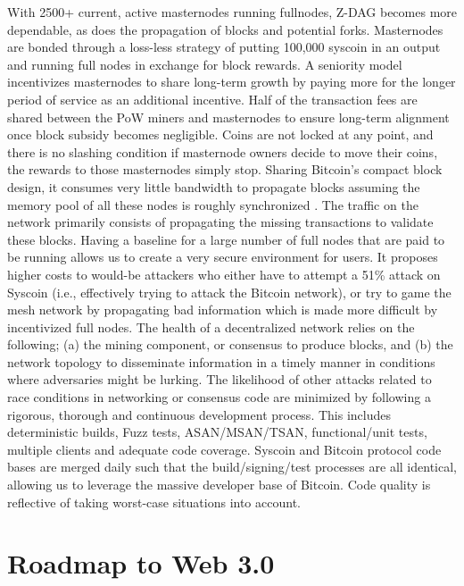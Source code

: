 \documentclass[peerreview]{ieeesyscoin}
\begin{document}
With 2500+ current, active masternodes running fullnodes, Z-DAG becomes more dependable, as does the propagation of blocks and potential forks. Masternodes are bonded through a loss-less strategy of putting 100,000 syscoin in an output and running full nodes in exchange for block rewards. A seniority model incentivizes masternodes to share long-term growth by paying more for the longer period of service as an additional incentive. Half of the transaction fees are shared between the PoW miners and masternodes to ensure long-term alignment once block subsidy becomes negligible. Coins are not locked at any point, and there is no slashing condition if masternode owners decide to move their coins, the rewards to those masternodes simply stop. Sharing Bitcoin’s compact block design, it consumes very little bandwidth to propagate blocks assuming the memory pool of all these nodes is roughly synchronized \cite{BitCore}. The traffic on the network primarily consists of propagating the missing transactions to validate these blocks. Having a baseline for a large number of full nodes that are paid to be running allows us to create a very secure environment for users. It proposes higher costs to would-be attackers who either have to attempt a 51\% attack on Syscoin (i.e., effectively trying to attack the Bitcoin network), or try to game the mesh network by propagating bad information which is made more difficult by incentivized full nodes. The health of a decentralized network relies on the following; (a) the mining component, or consensus to produce blocks, and (b) the network topology to disseminate information in a timely manner in conditions where adversaries might be lurking. The likelihood of other attacks related to race conditions in networking or consensus code are minimized by following a rigorous, thorough and continuous development process. This includes deterministic builds, Fuzz tests, ASAN/MSAN/TSAN, functional/unit tests, multiple clients and adequate code coverage. Syscoin and Bitcoin protocol code bases are merged daily such that the build/signing/test processes are all identical, allowing us to leverage the massive developer base of Bitcoin.  Code quality is reflective of taking worst-case situations into account. 

\section{Roadmap to Web 3.0}
\label{section:roadmap}
\end{document}
